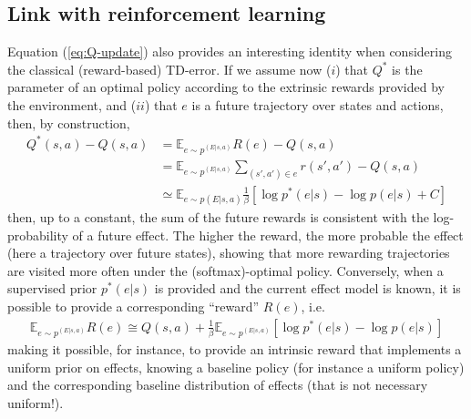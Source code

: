 \documentclass[runningheads]{llncs}
\begin{document}
\subsection*{Link with reinforcement learning}
Equation (\ref{eq:Q-update}) also provides an interesting identity when considering the classical (reward-based) TD-error. If we assume now ($i$) that $Q^*$ is the parameter of an optimal policy according to the extrinsic rewards provided by the environment, and ($ii$) that $e$ is a future trajectory over states and actions, then, by construction, 
\begin{align}\label{eq:Q-RL}
Q^*(s,a) - Q(s,a) &= \mathbb{E}_{e\sim p^(E|s,a)} R(e) - Q(s,a)\nonumber \\
			      &=\mathbb{E}_{e\sim p^(E|s,a)}\sum_{(s',a')\in e} r(s',a') - Q(s,a) \nonumber\\
                  &\simeq  \mathbb{E}_{e\sim p(E|s,a)}  \frac{1}{\beta} [\log p^*(e|s) - \log p(e|s) + C]
\end{align}
then, up to a constant, the sum of the future rewards is consistent with the log-probability of a future effect. The higher the reward, the more probable the effect (here a trajectory over future states), showing that more rewarding trajectories are visited more often under the (softmax)-optimal policy.   
Conversely, when a supervised prior $p^*(e|s)$ is provided and the current effect model is known, it is possible to provide a corresponding ``reward'' $R(e)$, i.e.
\begin{align}
\mathbb{E}_{e\sim p^(E|s,a)} R(e) \cong Q(s,a) + \frac{1}{\beta} \mathbb{E}_{e\sim p^(E|s,a)}[\log p^*(e|s) - \log p(e|s)] 
\end{align}
making it possible, for instance, to provide an intrinsic reward that implements a uniform prior on effects, knowing a baseline policy (for instance a uniform policy) and the corresponding baseline distribution of effects (that is not necessary uniform!).
\end{document}
